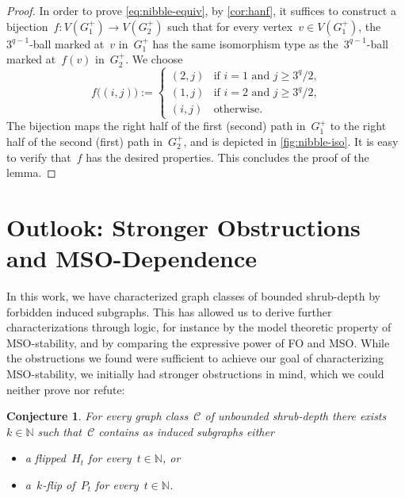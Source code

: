 \documentclass[11pt]{article}      \usepackage[margin=1in]{geometry}  \usepackage{microtype}
\newtheorem{conjecture}[theorem]{Conjecture}
\theoremstyle{definition}
\newcommand{\N}[0]{\mathrm{\mathbb{N}}}
\newcommand{\CC}{\mathcal{C}}
\renewcommand{\ge}{\geqslant}
\renewcommand{\geq}{\ge}
\begin{document}
\begin{proof}
    In order to prove \eqref{eq:nibble-equiv}, by \cref{cor:hanf}, it suffices to construct a bijection~$f : V(G_1^+) \to V(G_2^+)$ such that for every vertex~$v\in V(G_1^+)$, the~$3^{q-1}$-ball marked at~$v$ in~$G_1^+$ has the same isomorphism type as the~$3^{q-1}$-ball marked at~$f(v)$ in~$G_2^+$.
    We choose
    \[
        f\big((i,j)\big) := \begin{cases}
            (2,j) & \text{if~$i=1$ and~$j \geq 3^q / 2$,}\\
            (1,j) & \text{if~$i=2$ and~$j \geq 3^q / 2$,}\\
            (i,j) & \text{otherwise.}
        \end{cases}
    \]
    The bijection maps the right half of the first (second) path in~$G_1^+$ to the right half of the second (first) path in~$G_2^+$, and is
    depicted in \cref{fig:nibble-iso}. 
    It is easy to verify that~$f$ has the desired properties.
    This concludes the proof of the lemma.
\end{proof}

  
\section{Outlook: Stronger Obstructions and MSO-Dependence}\label{sec:outlook}
In this work, we have characterized graph classes of bounded shrub-depth by forbidden induced subgraphs.
This has allowed us to derive further characterizations through logic, for instance by the model theoretic property of MSO-stability, and by comparing the expressive power of FO and MSO.
While the obstructions we found were sufficient to achieve our goal of characterizing MSO-stability, we initially had stronger obstructions in mind, which we could neither prove nor refute:

\begin{conjecture}
    For every graph class~$\CC$ of unbounded shrub-depth there exists~$k\in\N$ such that~$\CC$ contains as induced subgraphs either
    \begin{itemize}
      \item a flipped~$H_t$ for every~$t\in\N$, or
      \item a~$k$-flip of~$P_t$ for every~$t \in \N$.
    \end{itemize}
\end{conjecture}
\end{document}
